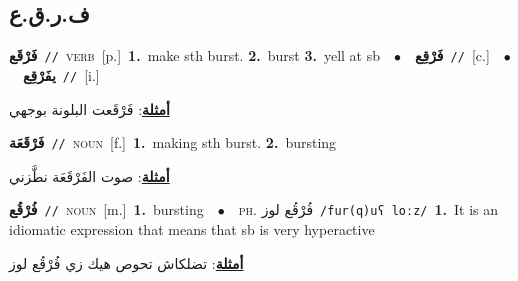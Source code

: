 \documentclass[10pt,a4paper,twoside]{article} %
\begin{document}
\begin{multicols}{2}
\vspace{-3mm}
\subsection*{\color{blue}\foreignlanguage{arabic}{ف.ر.ق.ع}\color{blue}{}} 

{\setlength\topsep{0pt}\textbf{\foreignlanguage{arabic}{فَرْقَع}}\ {\color{gray}\texttt{//}\color{black}}\ \textsc{verb}\ [p.]\ \textbf{1.}~make sth burst.  \textbf{2.}~burst  \textbf{3.}~yell at sb\ \ $\bullet$\ \ \setlength\topsep{0pt}\textbf{\foreignlanguage{arabic}{فَرْقِع}}\ {\color{gray}\texttt{//}\color{black}}\ [c.]\ \ $\bullet$\ \ \setlength\topsep{0pt}\textbf{\foreignlanguage{arabic}{يفَرْقِع}}\ {\color{gray}\texttt{//}\color{black}}\ [i.]\  \begin{flushright}\color{gray}\foreignlanguage{arabic}{\textbf{\underline{\foreignlanguage{arabic}{أمثلة}}}: فَرْقَعت البلونة بوجهي}\end{flushright}\color{black}} \vspace{2mm}

{\setlength\topsep{0pt}\textbf{\foreignlanguage{arabic}{فَرْقَعَة}}\ {\color{gray}\texttt{//}\color{black}}\ \textsc{noun}\ [f.]\ \textbf{1.}~making sth burst.  \textbf{2.}~bursting\  \begin{flushright}\color{gray}\foreignlanguage{arabic}{\textbf{\underline{\foreignlanguage{arabic}{أمثلة}}}: صوت الفَرْقَعَة نطَّزني}\end{flushright}\color{black}} \vspace{2mm}

{\setlength\topsep{0pt}\textbf{\foreignlanguage{arabic}{فُرْقُع}}\ {\color{gray}\texttt{//}\color{black}}\ \textsc{noun}\ [m.]\ \textbf{1.}~bursting\ \ $\bullet$\ \ \textsc{ph.} \color{gray} \foreignlanguage{arabic}{فُرْقُع لوز}\color{black}\ {\color{gray}\texttt{/{\sffamily fur(q)uʕ loːz}/}\color{black}}\ \textbf{1.}~It is an idiomatic expression that means that sb is very hyperactive\  \begin{flushright}\color{gray}\foreignlanguage{arabic}{\textbf{\underline{\foreignlanguage{arabic}{أمثلة}}}: تضلكاش تحوص هيك زي فُرْقُع لوز}\end{flushright}\color{black}} \vspace{2mm}


\end{multicols}
\end{document}
